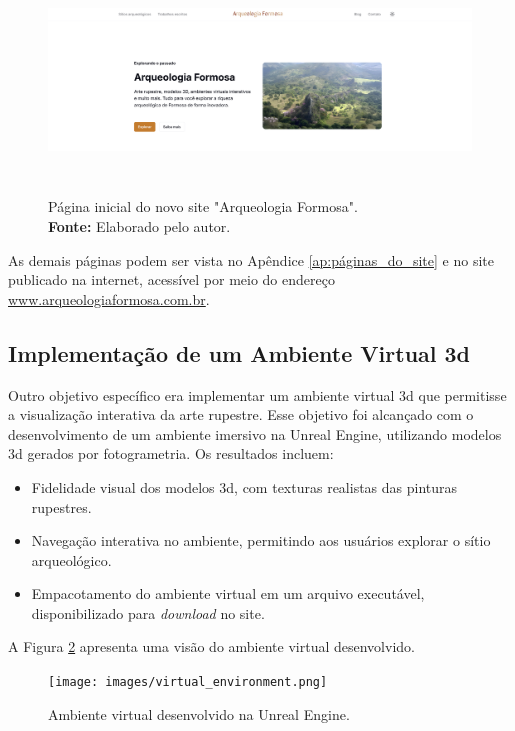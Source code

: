 \begin{figure}[H]
    \centering
    \includegraphics[height=6cm, keepaspectratio]{img/site/hero1.png}
    \caption{Página inicial do novo site "Arqueologia Formosa". \\
    \textbf{Fonte:} Elaborado pelo autor.}
    \label{fig:site_homepage}
\end{figure}

As demais páginas podem ser vista no Apêndice \ref{ap:páginas_do_site} e no site publicado na internet, acessível por meio do endereço \url{www.arqueologiaformosa.com.br}.
\subsection{Implementação de um Ambiente Virtual \gls{3d}}
Outro objetivo específico era implementar um ambiente virtual \gls{3d} que permitisse a visualização interativa da arte rupestre. Esse objetivo foi alcançado com o desenvolvimento de um ambiente imersivo na Unreal Engine, utilizando modelos \gls{3d} gerados por fotogrametria. Os resultados incluem:
\begin{itemize}
    \item Fidelidade visual dos modelos \gls{3d}, com texturas realistas das pinturas rupestres.
    \item Navegação interativa no ambiente, permitindo aos usuários explorar o sítio arqueológico.
    \item Empacotamento do ambiente virtual em um arquivo executável, disponibilizado para \textit{download} no site.
\end{itemize}

A Figura \ref{fig:virtual_environment} apresenta uma visão do ambiente virtual desenvolvido.

\begin{figure}[H]
    \centering
    \texttt{[image: images/virtual\_environment.png]}
    \caption{Ambiente virtual desenvolvido na Unreal Engine.}
    \label{fig:virtual_environment}
\end{figure}


